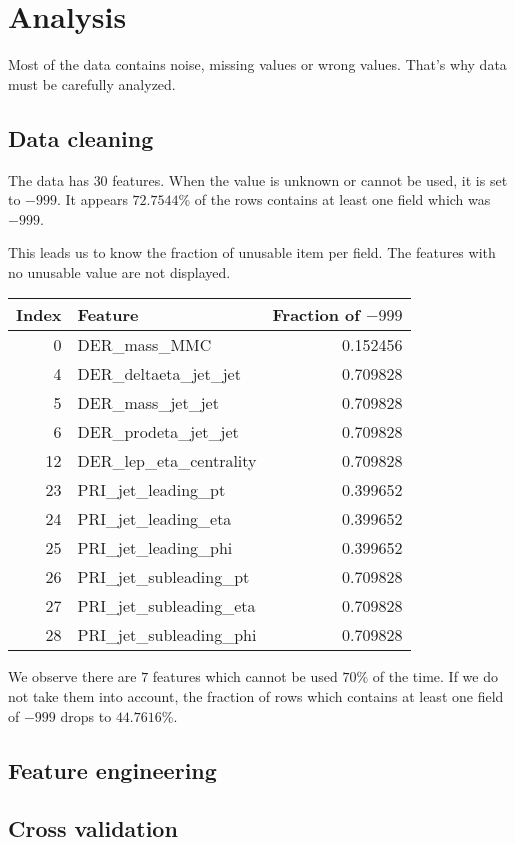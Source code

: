 \section{Analysis}
\label{sec:analysis}

Most of the data contains noise, missing values or wrong values. That's why data must be carefully analyzed.

\subsection{Data cleaning}


The data has $30$ features. When the value is unknown or cannot be used, it is set to $-999$. It appears $72.7544$\% of the rows contains at least one field which was $-999$.

This leads us to know the fraction of unusable item per field. The features with no unusable value are not displayed.

\begin{tabular}{rlr} \hline
  Index & Feature & Fraction of $-999$ \\ \hline
  0 & DER\_mass\_MMC & 0.152456 \\
  4 & DER\_deltaeta\_jet\_jet & 0.709828 \\
  5 & DER\_mass\_jet\_jet & 0.709828 \\
  6 & DER\_prodeta\_jet\_jet & 0.709828 \\
  12 & DER\_lep\_eta\_centrality & 0.709828 \\
  23 & PRI\_jet\_leading\_pt & 0.399652 \\
  24 & PRI\_jet\_leading\_eta & 0.399652 \\
  25 & PRI\_jet\_leading\_phi & 0.399652 \\
  26 & PRI\_jet\_subleading\_pt & 0.709828 \\
  27 & PRI\_jet\_subleading\_eta & 0.709828 \\
  28 & PRI\_jet\_subleading\_phi & 0.709828 \\ \hline
\end{tabular}

We observe there are $7$ features which cannot be used $70\%$ of the time. If we do not take them into account, the fraction of rows which contains at least one field of $-999$ drops to $44.7616$\%.

\subsection{Feature engineering}


\subsection{Cross validation}
